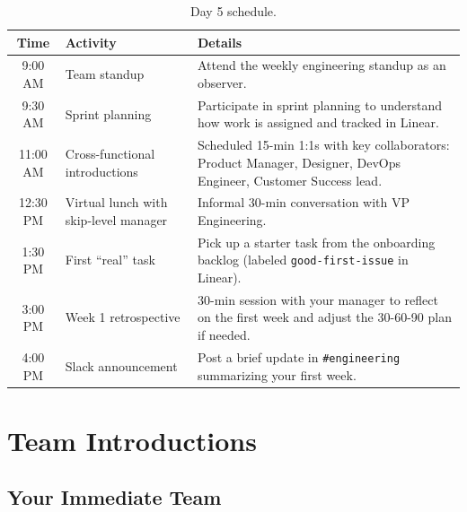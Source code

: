 \documentclass[
    language=english,
    doctype=onboarding-guide,
    institution=none,
]{../../omnilatex}
\begin{document}
\begin{table}[h]
    \centering
    \begin{tabular}{clp{7cm}}
        \toprule
        \textbf{Time} & \textbf{Activity} & \textbf{Details} \\
        \midrule
        9:00 AM  & Team standup & Attend the weekly engineering standup as an
            observer. \\
        9:30 AM  & Sprint planning & Participate in sprint planning to
            understand how work is assigned and tracked in Linear. \\
        11:00 AM & Cross-functional introductions & Scheduled 15-min 1:1s with
            key collaborators: Product Manager, Designer, DevOps Engineer,
            Customer Success lead. \\
        12:30 PM & Virtual lunch with skip-level manager & Informal 30-min
            conversation with VP Engineering. \\
        1:30 PM  & First ``real'' task & Pick up a starter task from the
            onboarding backlog (labeled \texttt{good-first-issue} in Linear). \\
        3:00 PM  & Week 1 retrospective & 30-min session with your manager to
            reflect on the first week and adjust the 30-60-90 plan if needed. \\
        4:00 PM  & Slack announcement & Post a brief update in
            \texttt{\#engineering} summarizing your first week. \\
        \bottomrule
    \end{tabular}
    \caption{Day 5 schedule.}
\end{table}

\section{Team Introductions}

\subsection{Your Immediate Team}
\end{document}
